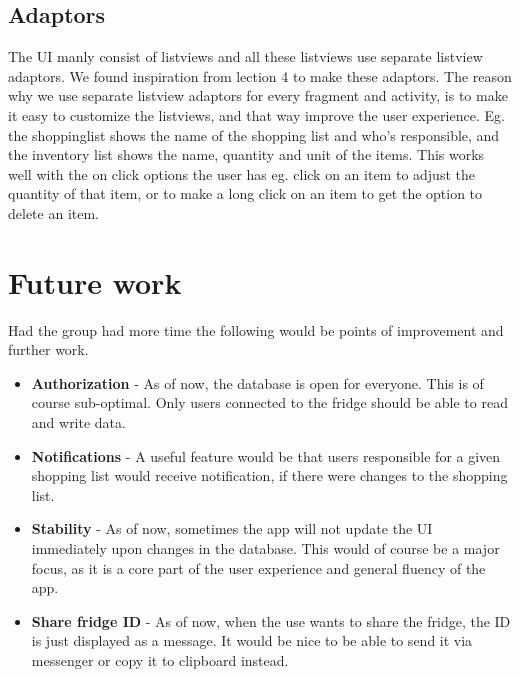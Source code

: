 \documentclass[12pt]{article}
\begin{document}
\subsection{Adaptors}
The UI manly consist of listviews and all these listviews use separate listview adaptors. We found inspiration from lection 4 to make these adaptors. The reason why we use separate listview adaptors for every fragment and activity, is to make it easy to customize the listviews, and that way improve the user experience. Eg. the shoppinglist shows the name of the shopping list and who's responsible, and the inventory list shows the name, quantity and unit of the items. This works well with the on click options the user has eg. click on an item to adjust the quantity of that item, or to make a long click on an item to get the option to delete an item.

\section{Future work}
Had the group had more time the following would be points of improvement and further work.
\begin{itemize}
	\item \textbf{Authorization} - As of now, the database is open for everyone. This is of course sub-optimal. Only users connected to the fridge should be able to read and write data.
	\item \textbf{Notifications} - A useful feature would be that users responsible for a given shopping list would receive notification, if there were changes to the shopping list.
	\item \textbf{Stability} - As of now, sometimes the app will not update the UI immediately upon changes in the database. This would of course be a major focus, as it is a core part of the user experience and general fluency of the app.
	\item \textbf{Share fridge ID} - As of now, when the use wants to share the fridge, the ID is just displayed as a message. It would be nice to be able to send it via messenger or copy it to clipboard instead.
\end{itemize}
\end{document}
